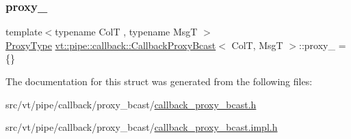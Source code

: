 \subsubsection{\texorpdfstring{proxy\+\_\+}{proxy\_}}
{\footnotesize\ttfamily template$<$typename ColT , typename MsgT $>$ \\
\hyperlink{structvt_1_1pipe_1_1callback_1_1_callback_proxy_bcast_a27c62cb9cbd1dcd3f135dcd98d98c991}{Proxy\+Type} \hyperlink{structvt_1_1pipe_1_1callback_1_1_callback_proxy_bcast}{vt\+::pipe\+::callback\+::\+Callback\+Proxy\+Bcast}$<$ ColT, MsgT $>$\+::proxy\+\_\+ = \{\}\hspace{0.3cm}{\ttfamily [private]}}



The documentation for this struct was generated from the following files\+:\begin{DoxyCompactItemize}
\item 
src/vt/pipe/callback/proxy\+\_\+bcast/\hyperlink{callback__proxy__bcast_8h}{callback\+\_\+proxy\+\_\+bcast.\+h}\item 
src/vt/pipe/callback/proxy\+\_\+bcast/\hyperlink{callback__proxy__bcast_8impl_8h}{callback\+\_\+proxy\+\_\+bcast.\+impl.\+h}\end{DoxyCompactItemize}
